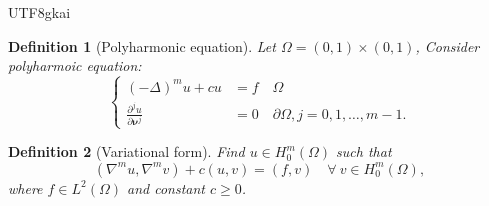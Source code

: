 \documentclass[notheorems,serif]{beamer}
\newtheorem{definition}{\textbf{Definition}}
\begin{document}
\begin{CJK}{UTF8}{gkai}
\begin{frame}
\begin{definition}[Polyharmonic equation]
  Let $\Omega = (0, 1)\times(0, 1)$, Consider polyharmoic equation:
  $$
  \left\{
  \begin{aligned}
      (-\Delta)^m u + c u & = f \quad \Omega\\
      \frac{\partial^j u}{\partial \boldsymbol{\nu}^j} & = 0 \quad \partial\Omega,
      j = 0, 1, \dots, m-1.
  \end{aligned}
  \right.
  $$
\end{definition}
\begin{definition}[Variational form]
Find $u\in H_0^m(\Omega)$ such that
$$
(\nabla^mu, \nabla^mv)+c(u, v)=(f, v)\quad\forall~v\in H_0^m(\Omega),
$$
where $f\in L^2(\Omega)$ and constant $c\geq0$.
\end{definition}
\hspace*{\fill} \\
\hspace*{\fill} \\
\hspace*{\fill} \\
\hspace*{\fill} \\
\hspace*{\fill} \\
\end{frame}



\end{CJK}
\end{document}
